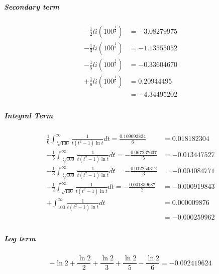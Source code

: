 \subparagraph{Secondary term}
\begin{equation*}
\begin{split}
- \frac{1}{2} li(100^{\frac{1}{2}}) & = -3.08279975\\
- \frac{1}{3} li(100^{\frac{1}{3}}) & = -1.13555052\\
- \frac{1}{5} li(100^{\frac{1}{5}}) & = -0.33604670\\
+ \frac{1}{6} li(100^{\frac{1}{6}}) & = 0.20944495\\
& = -4.34495202\\
\end{split}
\end{equation*}

\subparagraph{Integral Term}
\begin{equation*}
\begin{split}
	\frac{1}{6} \int_{\sqrt[6]{100}}^{\infty}\frac{1}{t(t^2-1)\ln t} dt =
		\frac{0.109093824}{6} &= 0.018182304\\
	- \frac{1}{5} \int_{\sqrt[5]{100}}^{\infty}\frac{1}{t(t^2-1)\ln t} dt =
		-\frac{0.067237637}{5} &= -0.013447527\\
	- \frac{1}{3} \int_{\sqrt[3]{100}}^{\infty}\frac{1}{t(t^2-1)\ln t} dt =
		-\frac{0.012254312}{3} &= -0.004084771\\
	- \frac{1}{2} \int_{\sqrt{100}}^{\infty}\frac{1}{t(t^2-1)\ln t} dt =
		-\frac{0.001839687}{2} &= -0.000919843\\
	+ \int_{100}^{\infty}\frac{1}{t(t^2-1)\ln t} dt &= 0.000009876\\
													&= -0.000259962 \\
\end{split}
\end{equation*}

\subparagraph{Log term}
\begin{equation*}
	-\ln 2 + \frac{\ln 2}{2} + \frac{\ln 2}{3} + \frac{\ln 2}{5} - \frac{\ln 2}{6} = -0.092419624
\end{equation*}
